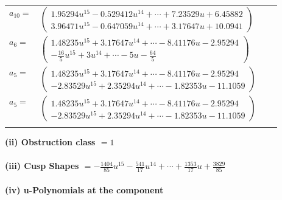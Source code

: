 \documentclass[1p]{elsarticle_modified}
\theoremstyle{definition}
\begin{document}
\begin{tabular}{m{7pt} m{180pt} m{7pt} m{180pt} }
\flushright $a_{10}=$&$\begin{pmatrix}1.95294 u^{15}-0.529412 u^{14}+\cdots+7.23529 u+6.45882\\3.96471 u^{15}-0.647059 u^{14}+\cdots+3.17647 u+10.0941\end{pmatrix}$ \\
\flushright $a_{6}=$&$\begin{pmatrix}1.48235 u^{15}+3.17647 u^{14}+\cdots-8.41176 u-2.95294\\-\frac{16}{5} u^{15}+3 u^{14}+\cdots-5 u-\frac{64}{5}\end{pmatrix}$ \\
\flushright $a_{5}=$&$\begin{pmatrix}1.48235 u^{15}+3.17647 u^{14}+\cdots-8.41176 u-2.95294\\-2.83529 u^{15}+2.35294 u^{14}+\cdots-1.82353 u-11.1059\end{pmatrix}$\\ \flushright $a_{5}=$&$\begin{pmatrix}1.48235 u^{15}+3.17647 u^{14}+\cdots-8.41176 u-2.95294\\-2.83529 u^{15}+2.35294 u^{14}+\cdots-1.82353 u-11.1059\end{pmatrix}$\\&\end{tabular}
\flushleft \textbf{(ii) Obstruction class $= 1$}\\~\\
\flushleft \textbf{(iii) Cusp Shapes $= -\frac{1404}{85} u^{15}-\frac{541}{17} u^{14}+\cdots+\frac{1353}{17} u+\frac{3829}{85}$}\\~\\
\newpage\renewcommand{\arraystretch}{1}
\flushleft \textbf{(iv) u-Polynomials at the component}\newline \\
\end{document}
